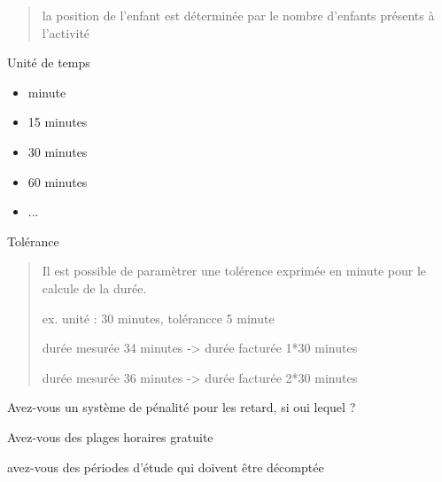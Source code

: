 \documentclass[letterpaper,10pt,english]{sphinxmanual}
\begin{document}
\begin{itemize}
\begin{itemize}
\begin{itemize}
\begin{itemize}
\begin{quote}
la position de l'enfant est déterminée par le nombre d'enfants présents à l'activité
\end{quote}

\end{itemize}

\end{itemize}

\item {} 
Unité de temps
\begin{itemize}
\item {} 
minute

\item {} 
15 minutes

\item {} 
30 minutes

\item {} 
60 minutes

\item {} 
...

\end{itemize}

\item {} 
Tolérance
\begin{quote}

Il est possible de paramètrer une tolérence exprimée en minute pour le calcule de la durée.

\begin{DUlineblock}{0em}
\item[] ex. unité : 30 minutes, tolérancce 5 minute
\item[]
\begin{DUlineblock}{\DUlineblockindent}
\item[] durée mesurée 34 minutes -\textgreater{} durée facturée 1*30 minutes
\item[] durée mesurée 36 minutes -\textgreater{} durée facturée 2*30 minutes
\end{DUlineblock}
\end{DUlineblock}
\end{quote}

\item {} 
Avez-vous un système de pénalité pour les retard, si oui lequel ?

\item {} 
Avez-vous des plages horaires gratuite

\item {} 
avez-vous des périodes d'étude qui doivent être décomptée

\end{itemize}

\end{itemize}
\end{document}
